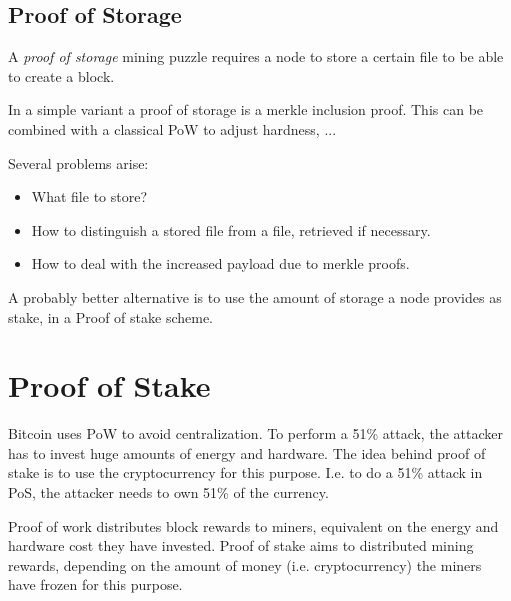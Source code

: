 \subsection{Proof of Storage}

\begin{definition} A \emph{proof of storage} mining puzzle requires a node to store a certain file to be able to create a block.	
\end{definition}

\begin{note}
In a simple variant a proof of storage is a merkle inclusion proof.
This can be combined with a classical PoW to adjust hardness, ...

Several problems arise:
\begin{itemize}
	\item What file to store? 
	\item How to distinguish a stored file from a file, retrieved if necessary.
	\item How to deal with the increased payload due to merkle proofs.
\end{itemize}
\end{note}

A probably better alternative is to use the amount of storage a node provides as stake, in a Proof of stake scheme.

\section{Proof of Stake}
Bitcoin uses PoW to avoid centralization. To perform a 51\% attack, the attacker has to invest huge amounts of energy and hardware. 
The idea behind proof of stake is to use the cryptocurrency for this purpose. 
I.e. to do a 51\% attack in PoS, the attacker needs to own 51\% of the currency.

\begin{definition}
	Proof of work distributes block rewards to miners, equivalent on the energy and hardware cost they have invested. Proof of stake aims to distributed mining rewards, depending on the amount of money (i.e. cryptocurrency) the miners have frozen for this purpose.
\end{definition}

